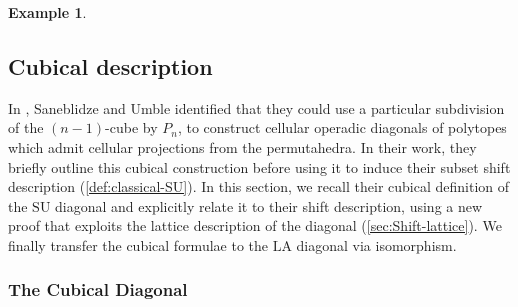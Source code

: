 \documentclass{amsart}
\theoremstyle{definition}
\newtheorem{example}[theorem]{Example}
\newcommand{\SU}{\mathrm{SU}}
\newcommand{\LA}{\mathrm{LA}}
\begin{document}
\begin{example}
\begin{center}
{
}
\end{center}


\end{example}


\subsection{Cubical description}
\label{sec:Cubical}

In \cite{SaneblidzeUmble}, Saneblidze and Umble identified that they could use a particular subdivision of the $(n-1)$-cube by $P_{n}$, to construct cellular operadic diagonals of polytopes which admit cellular projections from the permutahedra.
In their work, they briefly outline this cubical construction before using it to induce their subset shift description (\cref{def:classical-SU}).
In this section, we recall their cubical definition of the $\SU$ diagonal and explicitly relate it to their shift description, using a new proof that exploits the lattice description of the diagonal (\cref{sec:Shift-lattice}).
We finally transfer the cubical formulae to the $\LA$ diagonal via isomorphism.


\subsubsection{The Cubical Diagonal}
\end{document}
